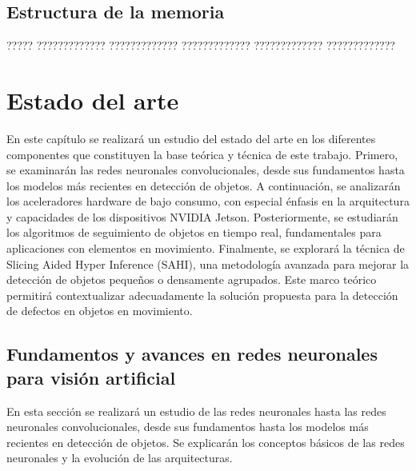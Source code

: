 \documentclass[11pt,spanish,listoffigures,listoftables]{tfgetsinf}
\begin{document}
\section{Estructura de la memoria}

????? ????????????? ????????????? ????????????? ????????????? ????????????? 




\chapter{Estado del arte}

En este capítulo se realizará un estudio del estado del arte en los diferentes componentes que constituyen la base teórica y técnica de este trabajo. Primero, se examinarán las redes neuronales convolucionales, desde sus fundamentos hasta los modelos más recientes en detección de objetos. A continuación, se analizarán los aceleradores hardware de bajo consumo, con especial énfasis en la arquitectura y capacidades de los dispositivos NVIDIA Jetson. Posteriormente, se estudiarán los algoritmos de seguimiento de objetos en tiempo real, fundamentales para aplicaciones con elementos en movimiento. Finalmente, se explorará la técnica de Slicing Aided Hyper Inference (SAHI), una metodología avanzada para mejorar la detección de objetos pequeños o densamente agrupados. Este marco teórico permitirá contextualizar adecuadamente la solución propuesta para la detección de defectos en objetos en movimiento.

\section{Fundamentos y avances en redes neuronales para visión artificial}
En esta sección se realizará un estudio de las redes neuronales hasta las redes neuronales convolucionales, desde sus fundamentos hasta los modelos más recientes en detección de objetos. Se explicarán los conceptos básicos de las redes neuronales y la evolución de las arquitecturas.
\end{document}

